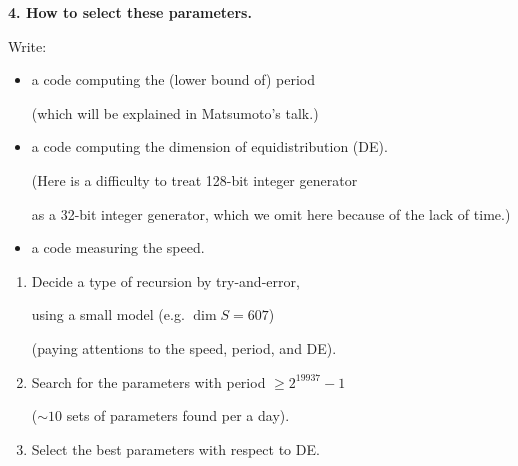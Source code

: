 \documentclass[a4j,12pt,landscape]{jarticle}
\begin{document}
\newpage
{\bf 4. How to select these parameters.}

Write: 
\begin{itemize}
\item a code computing the (lower bound of) period

(which will be explained in Matsumoto's talk.)
\item  a code computing the dimension of equidistribution (DE).

(Here is a difficulty to treat 128-bit integer generator 

as a 32-bit integer generator,
which we omit here because of the lack of time.)
%

\item a code measuring the speed.
\end{itemize}

\newpage
\begin{enumerate}
\item 
Decide a type of recursion by try-and-error,

using a small model (e.g. $\dim S = 607$)

(paying attentions to the speed, period, and DE).
\item
Search for the parameters 
with period $\geq 2^{19937}-1$ 

($\sim 10$ sets of parameters found per a day).
\item
Select the best parameters with respect to DE.
\end{enumerate}
\end{document}
